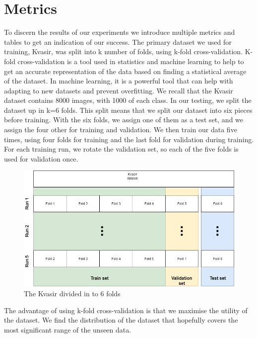 \section{Metrics}
To discern the results of our experiments we introduce multiple metrics and tables to get an indication of our success. The primary dataset we used for training, Kvasir, was split into k number of folds, using k-fold cross-validation. K-fold cross-validation is a tool used in statistics and machine learning to help to get an accurate representation of the data based on finding a statistical average of the dataset.  In machine learning, it is a powerful tool that can help with adapting to new datasets and prevent overfitting.  We recall that the Kvasir dataset contains 8000 images, with 1000 of each class.
In our testing, we split the dataset up in k=6 folds. This split means that we split our dataset into six pieces before training.  With the six folds, we assign one of them as a test set, and we assign the four other for training and validation. We then train our data five times, using four folds for training and the last fold for validation during training. For each training run, we rotate the validation set, so each of the five folds is used for validation once.


\begin{figure}[h]
\hspace*{-1cm}                                                           
\centering
\includegraphics[scale=0.4]{experiments/figures/KfoldKvasir_compressed.png}
\caption{The Kvasir divided in to 6 folds}
\label{fig:KfoldKvasir}
\end{figure}

The advantage of using k-fold cross-validation is that we maximise the utility of the dataset. We find the distribution of the dataset that hopefully covers the most significant range of the unseen data. 

